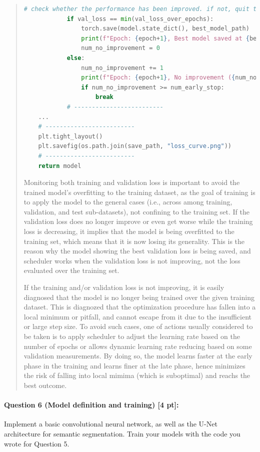 \documentclass[9pt]{article}
\begin{document}
\begin{quote}
\begin{lstlisting}[language=Python, basicstyle=\scriptsize]
            # check whether the performance has been improved. if not, quit training
            if val_loss == min(val_loss_over_epochs):
                torch.save(model.state_dict(), best_model_path)
                print(f"Epoch: {epoch+1}, Best model saved at {best_model_path}")
                num_no_improvement = 0
            else:
                num_no_improvement += 1
                print(f"Epoch: {epoch+1}, No improvement ({num_no_improvement} / {num_early_stop})")
                if num_no_improvement >= num_early_stop:
                    break
            # -------------------------
    ...
    # -------------------------
    plt.tight_layout()
    plt.savefig(os.path.join(save_path, "loss_curve.png"))
    # -------------------------
    return model
\end{lstlisting}

Monitoring both training and validation loss is important to avoid the trained model's overfitting to the training dataset, as the goal of training is to apply the model to the general cases (i.e., across among training, validation, and test sub-datasets), not confining to the training set. If the validation loss does no longer improve or even get worse while the training loss is decreasing, it implies that the model is being overfitted to the training set, which means that it is now losing its generality. This is the reason why the model showing the best validation loss is being saved, and scheduler works when the validation loss is not improving, not the loss evaluated over the training set. 

If the training and/or validation loss is not improving, it is easily diagnosed that the model is no longer being trained over the given training dataset. This is diagnozed that the optimization procedure has fallen into a local minimum or pitfall, and cannot escape from it due to the insufficient or large step size. To avoid such cases, one of actions usually considered to be taken is to apply scheduler to adjust the learning rate based on the number of epochs or allows dynamic learning rate reducing based on some validation measurements. By doing so, the model learns faster at the early phase in the training and learns finer at the late phase, hence minimizes the risk of falling into local mimima (which is suboptimal) and reachs the best outcome.

\end{quote}

\paragraph{Question 6 (Model definition and training) [4 pt]:} 
Implement a basic convolutional neural network, as well as the U-Net architecture for semantic segmentation. Train your models with the code you wrote for Question 5.
\end{document}
